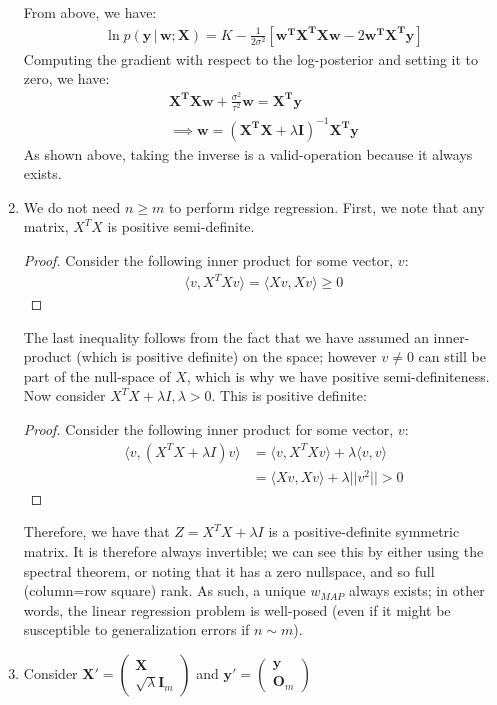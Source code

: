 \documentclass[submit]{harvardml}
\newcommand{\given}{\,|\,}
\renewcommand{\v}{\boldsymbol}
\begin{document}
\begin{enumerate}[label=(\alph*)]
	From above, we have:
	\begin{align*}
		\ln p(\v{y} \given \v{w}; \v{X}) = K - \frac{1}{2\sigma^2} \left[\v{w^T} \v{X^T} \v{X} \v{w} - 2 \v{w^T} \v{X^T} \v{y} \right]
	\end{align*}
	Computing the gradient with respect to the log-posterior and setting it to zero, we have:
	\begin{align*}
		\v{X^T X} \v{w} + \frac{\sigma^2}{\tau^2} \v{w} =  \v{X^T}\v{y}  \\
		\implies \v{w} = (\v{X^T X} + \lambda \v{I})^{-1} \v{X^T y}
	\end{align*}
	As shown above, taking the inverse is a valid-operation because it always exists.
	\item We do not need $n \geq m$ to perform ridge regression. First, we note that any matrix, $X^T X$ is positive semi-definite.
	\begin{proof} Consider the following inner product for some vector, $v$:
		\begin{align*}		
	 		\langle v, X^T X v \rangle = \langle X v, X v \rangle \geq 0
	 	\end{align*}
	\end{proof}
	The last inequality follows from the fact that we have assumed an inner-product (which is positive definite) on the space; however $v \neq 0$ can still be part of the null-space of $X$, which is why we have positive semi-definiteness. Now consider $X^T X + \lambda I, \lambda > 0 $. This is positive definite:
	\begin{proof} Consider the following inner product for some vector, $v$:
		\begin{align*}		
			\langle v, (X^T X  + \lambda I) v \rangle &= \langle v, X^T X v \rangle + \lambda \langle v, v \rangle \\
			&= \langle X v,  X v \rangle + \lambda ||v^2 || > 0
		\end{align*}
	\end{proof}
	Therefore, we have that $ Z = X^T X  + \lambda I $ is a positive-definite symmetric matrix. It is therefore always invertible; we can see this by either using the spectral theorem, or noting that it has a zero nullspace, and so full (column=row square) rank. As such, a unique $w_{MAP}$ always exists; in other words, the linear regression problem is well-posed (even if it might be susceptible to generalization errors if $n \sim m$).
	
	\item Consider $\v{X}' = \begin{pmatrix} \v{X} \\ \sqrt{\lambda} \v{I}_m \end{pmatrix}$ and $\v{y'} = \begin{pmatrix}
	\v{y} \\ \v{O}_m
	\end{pmatrix}$
	

\end{enumerate}
\end{document}
